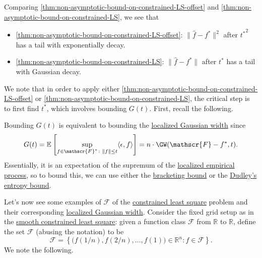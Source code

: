 \begin{remark}
	Comparing \autoref{thm:non-asymptotic-bound-on-constrained-LS-offset} and \autoref{thm:non-asymptotic-bound-on-constrained-LS}, we see that
	\begin{itemize}
		\item \autoref{thm:non-asymptotic-bound-on-constrained-LS-offset}: \(\lVert \hat{f} - f^{\ast}  \rVert ^2\) after \({t^{\ast} }^2\) has a tail with exponentially decay.
		\item \autoref{thm:non-asymptotic-bound-on-constrained-LS}: \(\lVert \hat{f} - f^{\ast}  \rVert \) after \(t^{\ast} \) has a tail with Gaussian decay.
	\end{itemize}
\end{remark}

We note that in order to apply either \autoref{thm:non-asymptotic-bound-on-constrained-LS-offset} or \autoref{thm:non-asymptotic-bound-on-constrained-LS}, the critical step is to first find \(t^{\ast} \), which involves bounding \(G(t)\). First, recall the following.

\begin{prev}
	Bounding \(G(t)\) is equivalent to bounding the \hyperref[def:localized-Gaussian-width]{localized Gaussian width} since
	\[
		G(t)
		= \mathbb{E}_{}\left[\sup _{f\in \mathscr{F} ^{\ast} \colon \lVert f \rVert \leq t} \langle \epsilon , f \rangle \right]
		= n \cdot \GW(\mathscr{F} - f^{\ast} , t).
	\]
	Essentially, it is an expectation of the supremum of the \hyperref[def:localized-EP]{localized empirical process}, so to bound this, we can use either the \hyperref[thm:bracketing-bound]{bracketing bound} or the \hyperref[thm:Dudley-entropy-bound]{Dudley's entropy bound}.
\end{prev}

Let's now see some examples of \(\mathscr{F} \) of the \hyperref[prb:constrained-LS]{constrained least square} problem and their corresponding \hyperref[def:localized-Gaussian-width]{localized Gaussian width}. Consider the fixed grid setup as in the \hyperref[prb:smooth-LS]{smooth constrained least square}: given a function class \(\mathscr{F} \) from \(\mathbb{R} \) to \(\mathbb{R} \), define the set \(\mathscr{F} \) (abusing the notation) to be
\[
	\mathscr{F} = \left\{ \big( f(1 / n), f(2 / n), \dots , f(1) \big) \in \mathbb{R} ^n \colon f \in \mathscr{F} \right\} .
\]
We note the following.

